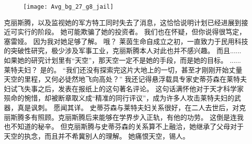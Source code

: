\documentclass[openany]{book}
\begin{document}
\begin{figure}[h]
    \centering
    \texttt{[image: Avg\_bg\_27\_g8\_jail]}
\end{figure}
\begin{dialogue}
     克丽斯腾，以及监视她的军方特工同时失去了消息，这恰恰说明计划已经进展到接近可实行的阶段。
     她可能欺骗了她的投资者。
     我们也在怀疑，但你说得很笃定，塞雷娅。
     因为我对她足够了解。
     哦？
     莱茵生命自成立之初，一直致力于民用科技的突破性研究，极少涉及军事工业，克丽斯腾本人对此也并不感兴趣。
     而且......
     如果她的研究计划里有“天空”，那天空一定不是她的手段，而是她的目标。
     ......
     莱特夫妇？
     是的。
     “我们还没有探索完这片大地上的一切，甚至才刚刚开始丈量天空的里程，又何必徒然地飞向高处？”
     我还记得悬浮载具专家史蒂芬森在莱特夫妇试飞失事之后，发表在报纸上的这句著名评论。
     这句话满怀他对于天才科学家殒命的惋惜，却被断章取义成“精准的同行评议”，成为许多人攻击莱特夫妇的武器，真是讽刺。
     愿闻其详。
     史蒂芬森与莱特夫妇关系很好，在二人去世后，对克丽斯腾多有照顾。克丽斯腾后来能够在学界步入正轨，有他的功劳。
     这倒是连我也不知道的秘辛。
     但克丽斯腾与史蒂芬森的关系算不上融洽，她继承了父母对于天空的执念，而且并不希冀别人的理解。
     她痛恨天空，锡人。
\end{dialogue}
\end{document}
